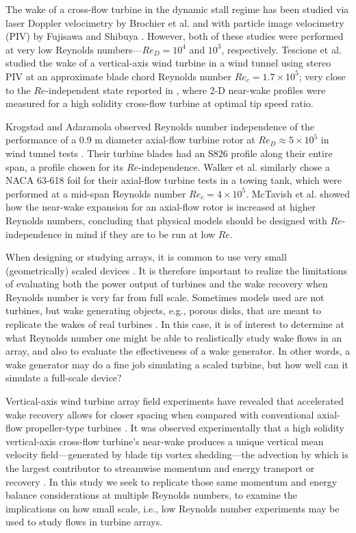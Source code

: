 \documentclass[energies,article,accept,moreauthors,pdftex,12pt,a4paper]{mdpi}
\begin{document}
The wake of a cross-flow turbine in the dynamic stall regime has been studied
via laser Doppler velocimetry by Brochier et al. \cite{Brochier1986} and with
particle image velocimetry (PIV) by Fujisawa and Shibuya \cite{Fujisawa2001}.
However, both of these studies were performed at very low Reynolds
numbers---$Re_D = 10^4$ and $10^3$, respectively. Tescione et al.
\cite{Tescione2014} studied the wake of a vertical-axis wind turbine in a wind
tunnel using stereo PIV at an approximate blade chord Reynolds number $Re_c =
1.7 \times 10^5$; very close to the $Re$-independent state reported in
\cite{Bachant2014}, where 2-D near-wake profiles were measured for a high
solidity cross-flow turbine at optimal tip speed ratio.

Krogstad and Adaramola observed Reynolds number independence of the performance
of a 0.9 m diameter axial-flow turbine rotor at $Re_D \approx 5 \times 10^5$ in
wind tunnel tests \cite{Krogstad2012a}. Their turbine blades had an S826 profile
along their entire span, a profile chosen for its $Re$-independence. Walker et
al. \cite{Walker2014} similarly chose a NACA 63-618 foil for their axial-flow
turbine tests in a towing tank, which were performed at a mid-span Reynolds
number $Re_c = 4 \times 10^5$. McTavish et al. \cite{McTavish2013} showed how
the near-wake expansion for an axial-flow rotor is increased at higher Reynolds
numbers, concluding that physical models should be designed with
$Re$-independence in mind if they are to be run at low $Re$.

When designing or studying arrays, it is common to use very small
(geometrically) scaled devices \cite{Chamorro2011, Chamorro2011b}. It is
therefore important to realize the limitations of evaluating both the power
output of turbines and the wake recovery when Reynolds number is very far from
full scale. Sometimes models used are not turbines, but wake generating objects,
e.g., porous disks, that are meant to replicate the wakes of real turbines
\cite{Goldenberg1983}. In this case, it is of interest to determine at what
Reynolds number one might be able to realistically study wake flows in an array,
and also to evaluate the effectiveness of a wake generator. In other words, a
wake generator may do a fine job simulating a scaled turbine, but how well can
it simulate a full-scale device?

Vertical-axis wind turbine array field experiments have revealed that
accelerated wake recovery allows for closer spacing when compared with
conventional axial-flow propeller-type turbines \cite{Dabiri2011, Kinzel2012}.
It was observed experimentally that a high solidity vertical-axis cross-flow
turbine's near-wake produces a unique vertical mean velocity field---generated
by blade tip vortex shedding---the advection by which is the largest contributor
to streamwise momentum and energy transport or recovery \cite{Bachant2015-JoT}.
In this study we seek to replicate those same momentum and energy balance
considerations at multiple Reynolds numbers, to examine the implications on how
small scale, i.e., low Reynolds number experiments may be used to study flows in
turbine arrays.
\end{document}

